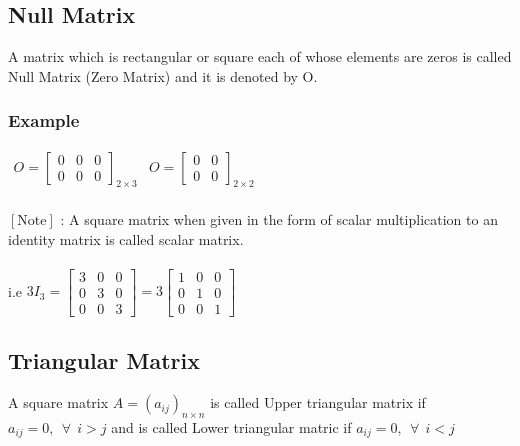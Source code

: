 \documentclass{article}
\begin{document}
	\subsection{Null Matrix}
	A matrix which is rectangular or square each of whose elements are zeros is called Null Matrix (Zero Matrix) and it is denoted by O.
	
	\subsubsection{Example}
	$ \begin{array}{cc}
		O = {
			\left[ \begin{array}{ccc}
				0 & 0 & 0 \\
				0 & 0 & 0
			\end{array}\right]
		}_{2 \times 3}
		&
		O = {
			\left[ \begin{array}{cc}
				0 & 0 \\ 0& 0
			\end{array}\right]
		}_{2 \times 2}
	\end{array} $
	\\ \\
	$ [ \text{Note} ] $ : A square matrix when given in the form of scalar multiplication to an identity matrix is called scalar matrix.
	\\ \\
	i.e $ 3I_3 = \left[ \begin{array}{ccc}
		3 & 0 & 0 \\
		0 & 3 & 0 \\
		0 & 0 & 3
	\end{array}\right] = 3 \left[\begin{array}{ccc}
		1 & 0 & 0 \\
		0 & 1 & 0 \\
		0 & 0 & 1
	\end{array}\right] $
	
	\subsection{Triangular Matrix}
	A square matrix $ A = (a_{ij})_{n \times n} $ is called Upper triangular matrix if $ a_{ij} = 0, ~~ \forall ~~ i > j $ and is called Lower triangular matric if $ a_{ij} = 0, ~~ \forall ~~ i < j$
	
\end{document}
